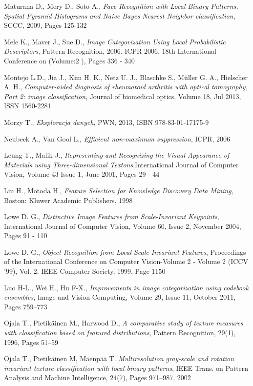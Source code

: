 \begin{thebibliography}{100}
 Maturana D., Mery D., Soto A., \emph{Face Recognition with Local Binary Patterns, Spatial Pyramid Histograms and Naive Bayes Nearest Neighbor classification}, SCCC, 2009, Pages 125-132

 Mele K., Maver J., Sue D., \emph{Image Categorization Using Local Probabilistic Descriptors}, Pattern Recognition, 2006. ICPR 2006. 18th International Conference on  (Volume:2 ), Pages 336 - 340

 Montejo L.D., Jia J., Kim H. K., Netz U. J., Blaschke S., Müller G. A., Hielscher A. H., \emph{Computer-aided diagnosis of rheumatoid arthritis with optical tomography, Part 2: image classification}, Journal of biomedical optics, Volume 18, Jul 2013, ISSN 1560-2281

 Morzy T., \emph{Eksploracja danych}, PWN, 2013, ISBN 978-83-01-17175-9

 Neubeck A., Van Gool L., \emph{Efficient non-maximum suppression}, ICPR, 2006

 Leung T., Malik J., \emph{Representing and Recognizing the Visual Appearance of Materials using Three-dimensional Textons},International Journal of Computer Vision, Volume 43 Issue 1, June 2001, Pages 29 - 44 

 Liu H., Motoda H., \emph{Feature Selection for Knowledge Discovery Data Mining}, Boston: Kluwer Academic Publishers, 1998

 Lowe D. G., \emph{Distinctive Image Features from Scale-Invariant Keypoints}, International Journal of Computer Vision, Volume 60, Issue 2, November 2004, Pages 91 - 110 

 Lowe D. G., \emph{Object Recognition from Local Scale-Invariant Features}, Proceedings of the International Conference on Computer Vision-Volume 2 - Volume 2 (ICCV '99), Vol. 2. IEEE Computer Society, 1999, Page 1150

 Luo H-L., Wei H., Hu F-X., \emph{Improvements in image categorization using codebook ensembles}, Image and Vision Computing, Volume 29, Issue 11, October 2011, Pages 759–773

 Ojala T., Pietikäinen M., Harwood D., \emph{A comparative study of texture measures with classification based on featured distributions}, Pattern Recognition, 29(1), 1996, Pages 51–59

 Ojala T., Pietikäinen M, Mäenpää T. \emph{Multiresolution gray-scale and rotation invariant texture classification with local binary patterns}, IEEE Trans. on Pattern Analysis and Machine Intelligence, 24(7), Pages 971–987, 2002


\end{thebibliography}
